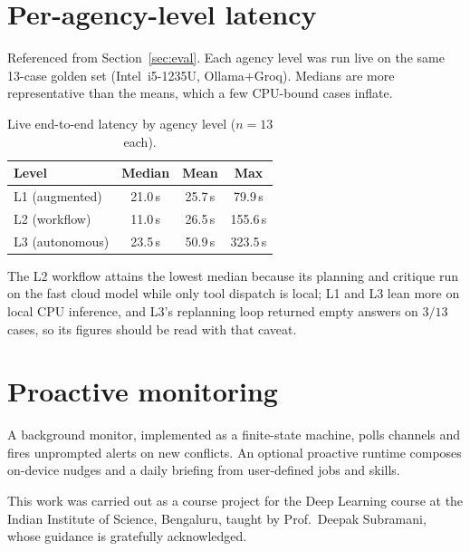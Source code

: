 \documentclass{ecai}
\begin{document}
\section{Per-agency-level latency}\label{app:latency}

Referenced from Section~\ref{sec:eval}. Each agency level was run live on the same
13-case golden set (Intel~i5-1235U, Ollama${+}$Groq). Medians are more
representative than the means, which a few CPU-bound cases inflate.

\begin{table}[h]
\centering
\caption{Live end-to-end latency by agency level ($n{=}13$ each).}
\label{tab:latency}
\begin{tabular}{lccc}
\toprule
Level & Median & Mean & Max \\
\midrule
L1 (augmented)  & 21.0\,s & 25.7\,s &  79.9\,s \\
L2 (workflow)   & 11.0\,s & 26.5\,s & 155.6\,s \\
L3 (autonomous) & 23.5\,s & 50.9\,s & 323.5\,s \\
\bottomrule
\end{tabular}
\end{table}

The L2 workflow attains the lowest median because its planning and critique run on
the fast cloud model while only tool dispatch is local; L1 and L3 lean more on
local CPU inference, and L3's replanning loop returned empty answers on $3/13$
cases, so its figures should be read with that caveat.


\section{Proactive monitoring}\label{sec:proactive}

A background monitor, implemented as a finite-state machine, polls channels and
fires unprompted alerts on new conflicts. An optional proactive runtime composes
on-device nudges and a daily briefing from user-defined jobs and skills.





\begin{ack}
This work was carried out as a course project for the Deep Learning course at
the Indian Institute of Science, Bengaluru, taught by Prof.~Deepak Subramani,
whose guidance is gratefully acknowledged.
\end{ack}
\end{document}
